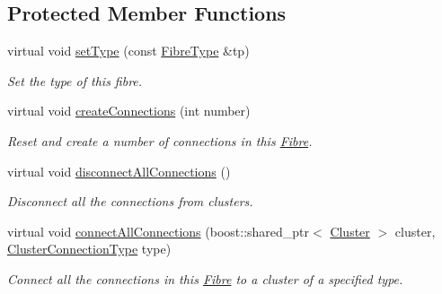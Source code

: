 \subsection*{\-Protected \-Member \-Functions}
\begin{DoxyCompactItemize}
\item 
virtual void \hyperlink{classcryomesh_1_1structures_1_1Fibre_acdde6519103d56cb26d2c1274122622b}{set\-Type} (const \hyperlink{classcryomesh_1_1structures_1_1Fibre_aecbba6d46a76f888b3722491b674f5e4}{\-Fibre\-Type} \&tp)
\begin{DoxyCompactList}\small\item\em \-Set the type of this fibre. \end{DoxyCompactList}\item 
virtual void \hyperlink{classcryomesh_1_1structures_1_1Fibre_a2db9a8137da4294c38fc12028bce2d20}{create\-Connections} (int number)
\begin{DoxyCompactList}\small\item\em \-Reset and create a number of connections in this \hyperlink{classcryomesh_1_1structures_1_1Fibre}{\-Fibre}. \end{DoxyCompactList}\item 
virtual void \hyperlink{classcryomesh_1_1structures_1_1Fibre_adb26abfba4fa239f8606afb71f6f7d61}{disconnect\-All\-Connections} ()
\begin{DoxyCompactList}\small\item\em \-Disconnect all the connections from clusters. \end{DoxyCompactList}\item 
virtual void \hyperlink{classcryomesh_1_1structures_1_1Fibre_a9d1f47fb7ce5c18234054fcee35fd42b}{connect\-All\-Connections} (boost\-::shared\-\_\-ptr$<$ \hyperlink{classcryomesh_1_1structures_1_1Cluster}{\-Cluster} $>$ cluster, \hyperlink{classcryomesh_1_1structures_1_1Fibre_a1bae341ec1ee07bdc7855b287bee2061}{\-Cluster\-Connection\-Type} type)
\begin{DoxyCompactList}\small\item\em \-Connect all the connections in this \hyperlink{classcryomesh_1_1structures_1_1Fibre}{\-Fibre} to a cluster of a specified type. \end{DoxyCompactList}\end{DoxyCompactItemize}
